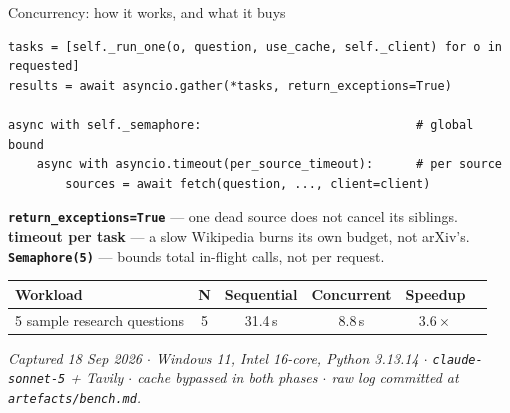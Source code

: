 \documentclass[aspectratio=169,11pt]{beamer}
\begin{document}
\begin{frame}[fragile]{Concurrency: how it works, and what it buys}
  \begin{lstlisting}[style=python]
tasks = [self._run_one(o, question, use_cache, self._client) for o in requested]
results = await asyncio.gather(*tasks, return_exceptions=True)

async with self._semaphore:                              # global bound
    async with asyncio.timeout(per_source_timeout):      # per source
        sources = await fetch(question, ..., client=client)
  \end{lstlisting}

  \vspace{0.2em}
  {\footnotesize
  \textbf{\texttt{return\_exceptions=True}} --- one dead source does not cancel its siblings.\quad
  \textbf{timeout per task} --- a slow Wikipedia burns its own budget, not arXiv's.\quad
  \textbf{\texttt{Semaphore(5)}} --- bounds total in-flight calls, not per request.}

  \vspace{0.3em}
  \begin{center}\small
  \begin{tabular}{lccccc}
    \toprule
    \textbf{Workload} & \textbf{N} & \textbf{Sequential} & \textbf{Concurrent} & \textbf{Speedup} \\
    \midrule
    5 sample research questions & 5 & 31.4\,s & 8.8\,s & $\mathbf{3.6\times}$ \\
    \bottomrule
  \end{tabular}
  \end{center}

  \vspace{0.2em}
  {\footnotesize\itshape Captured 18 Sep 2026 $\cdot$ Windows 11, Intel 16-core, Python 3.13.14
  $\cdot$ \texttt{claude-sonnet-5} + Tavily $\cdot$ cache bypassed in both phases $\cdot$
  raw log committed at \texttt{artefacts/bench.md}.}
\end{frame}
\end{document}
